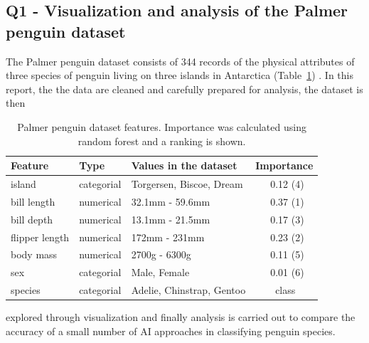 \documentclass[a4paper, 11pt]{article}
\begin{document}
\begin{center}
  \subsection*{Q1 - Visualization and analysis of the Palmer penguin dataset}
\end{center}

\noindent
The Palmer penguin dataset consists of 344 records of the physical attributes of three species of penguin 
living on three islands in Antarctica (Table~\ref{tab:dataset}) \cite{PM}. In this
report, the 
the data are cleaned and carefully prepared for analysis, the dataset is then  
\begin{table} %
  \small
  \begin{center}
  \vspace{-1.5\baselineskip} %
  \setlength{\abovecaptionskip}{5pt}
  \setlength{\belowcaptionskip}{5pt}
  \fontsize{10}{10}\selectfont %
  \begin{tabular}{l|l|l|l}
  \textbf{Feature}&\textbf{Type}&\textbf{Values in the dataset}&\textbf{Importance}\\
  \hline
  island&categorial&Torgersen, Biscoe, Dream&\ \ \ 0.12 (4)\\
  bill length&numerical&32.1mm - 59.6mm&\ \ \ 0.37 (1)\\
  bill depth&numerical&13.1mm - 21.5mm&\ \ \ 0.17 (3)\\
  flipper length&numerical&172mm - 231mm&\ \ \ 0.23 (2)\\
  body mass&numerical&2700g - 6300g&\ \ \ 0.11 (5)\\
  sex&categorial&Male, Female&\ \ \ 0.01 (6)\\
  species&categorial&Adelie, Chinstrap, Gentoo&\ \ \ \ class\\
  \end{tabular}
  \vspace{-2\baselineskip} %
  \end{center} 
  \caption{\centering\linespread{0.8}\selectfont Palmer penguin dataset features. Importance was calculated using random forest and a ranking is shown.}
  \vspace{-1\baselineskip} %
  \label{tab:dataset}
\end{table}
explored 
through visualization and finally analysis is carried out 
to compare the accuracy of a small number of AI approaches in classifying penguin species.
\end{document}
